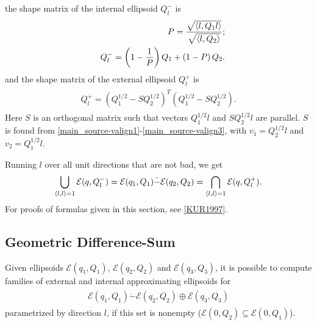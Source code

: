\documentclass[letterpaper,10pt,english]{sphinxmanual}
\begin{document}
the shape matrix of the internal ellipsoid $Q^-_l$ is
\begin{gather}
\begin{split}\begin{aligned}
&& P = \frac{\sqrt{\langle l, Q_1 l\rangle}}{\sqrt{\langle l, Q_2 \rangle}};\nonumber\\
&& Q^-_l = \left(1 - \dfrac{1}{P}\right)Q_1 + \left(1 - P\right)Q_2.
\label{minkdiff_ia}\end{aligned}\end{split}\notag
\end{gather}
and the shape matrix of the external ellipsoid $Q^+_l$ is
\label{main_source:equation-minkdiff_ea}\begin{gather}
\begin{split}Q^+_l = \left(Q_1^{1/2} - SQ_2^{1/2}\right)^T
\left(Q_1^{1/2} - SQ_2^{1/2}\right).\end{split}\label{main_source-minkdiff_ea}
\end{gather}
Here $S$ is an orthogonal matrix such that vectors
$Q_1^{1/2}l$ and $SQ_2^{1/2}l$ are parallel. $S$ is
found from \eqref{main_source-valign1}-\eqref{main_source-valign3}, with $v_1=Q_2^{1/2}l$ and
$v_2=Q_1^{1/2}l$.

Running $l$ over all unit directions that are not bad, we get
\begin{gather}
\begin{split}\bigcup_{\langle l,l\rangle=1} {\mathcal E}(q,Q_l^-) =
{\mathcal E}(q_1,Q_1)\dot{-}{\mathcal E}(q_2,Q_2) =
\bigcap_{\langle l,l\rangle=1} {\mathcal E}(q,Q_l^+) .\end{split}\notag
\end{gather}
For proofs of formulas given in this section, see {\hyperref[main_source:kur1997]{{[}KUR1997{]}}}.


\subsection{Geometric Difference-Sum}
\label{main_source:geometric-difference-sum}
Given ellipsoids ${\mathcal E}(q_1,Q_1)$,
${\mathcal E}(q_2,Q_2)$ and ${\mathcal E}(q_3,Q_3)$, it is
possible to compute families of external and internal approximating
ellipsoids for
\label{main_source:equation-minkmp}\begin{gather}
\begin{split}{\mathcal E}(q_1,Q_1) \dot{-} {\mathcal E}(q_2,Q_2) \oplus {\mathcal E}(q_3,Q_3)\end{split}\label{main_source-minkmp}
\end{gather}
parametrized by direction $l$, if this set is nonempty
(${\mathcal E}(0,Q_2)\subseteq{\mathcal E}(0,Q_1)$).
\end{document}
